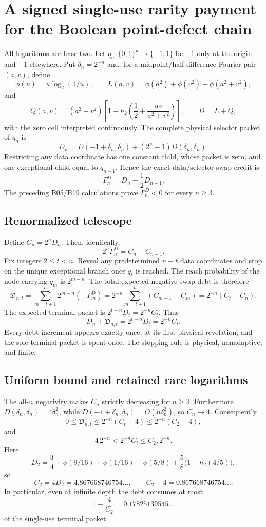 \section*{A signed single-use rarity payment for the Boolean point-defect chain}

All logarithms are base two.  Let $q_n:\{0,1\}^n\to\{-1,1\}$ be $+1$
only at the origin and $-1$ elsewhere.  Put $\delta_n=2^{-n}$ and, for a
midpoint/half-difference Fourier pair $(a,v)$, define
\[
 \phi(u)=u\log_2(1/u),\qquad
 L(a,v)=\phi(a^2)+\phi(v^2)-\phi(a^2+v^2),
\]
and
\[
 Q(a,v)=(a^2+v^2)\left[1-h_2\left(
 \frac12+\frac{|av|}{a^2+v^2}\right)\right],\qquad D=L+Q,
\]
with the zero cell interpreted continuously.  The complete physical
selector packet of $q_n$ is
\[
 D_n=D(-1+\delta_n,\delta_n)
 +(2^n-1)D(\delta_n,\delta_n).
\]
Restricting any data coordinate has one constant child, whose packet is
zero, and one exceptional child equal to $q_{n-1}$.  Hence the exact
data/selector swap credit is
\[
 \Gamma_n^D=D_n-\frac12D_{n-1}.
\]
The preceding B05/B19 calculations prove $\Gamma_n^D<0$ for every $n\ge3$.

\subsection*{Renormalized telescope}

Define $C_n=2^nD_n$.  Then, identically,
\[
 2^n\Gamma_n^D=C_n-C_{n-1}.                                      \tag{1}
\]
Fix integers $2\le t<n$.  Reveal any predetermined $n-t$ data coordinates
and stop on the unique exceptional branch once $q_t$ is reached.  The reach
probability of the node carrying $q_m$ is $2^{m-n}$.  The total expected
negative swap debt is therefore
\[
 \mathfrak D_{n,t}
 =\sum_{m=t+1}^n2^{m-n}(-\Gamma_m^D)
 =2^{-n}\sum_{m=t+1}^n(C_{m-1}-C_m)
 =2^{-n}(C_t-C_n).                                                \tag{2}
\]
The expected terminal packet is $2^{t-n}D_t=2^{-n}C_t$.  Thus
\[
 \boxed{D_n+\mathfrak D_{n,t}=2^{t-n}D_t=2^{-n}C_t.}              \tag{3}
\]
Every debt increment appears exactly once, at its first physical revelation,
and the sole terminal packet is spent once.  The stopping rule is physical,
nonadaptive, and finite.

\subsection*{Uniform bound and retained rare logarithms}

The all-$n$ negativity makes $C_n$ strictly decreasing for $n\ge3$.
Furthermore $D(\delta_n,\delta_n)=4\delta_n^2$, while
$D(-1+\delta_n,\delta_n)=O(n\delta_n^2)$, so $C_n\to4$.  Consequently
\[
 0\le\mathfrak D_{n,t}
 \le 2^{-n}(C_t-4)
 \le 2^{-n}(C_2-4),                                              \tag{4}
\]
and
\[
 4\,2^{-n}<2^{-n}C_t\le C_2,2^{-n}.                             \tag{5}
\]
Here
\[
 D_2=\frac34+\phi(9/16)+\phi(1/16)-\phi(5/8)
 +\frac58\bigl(1-h_2(4/5)\bigr),
\]
so
\[
 C_2=4D_2=4.867668746754\ldots,
 \qquad C_2-4=0.867668746754\ldots .                             \tag{6}
\]
In particular, even at infinite depth the debt consumes at most
\[
 1-\frac4{C_2}=0.17825139545\ldots
\]
of the single-use terminal packet.

